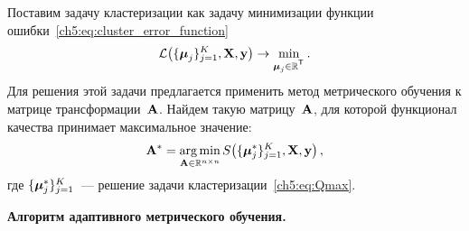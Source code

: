 \documentclass[11pt, a5paper]{dissert}
\begin{document}
Поставим задачу кластеризации как задачу минимизации функции ошибки~\eqref{ch5:eq:cluster_error_function}
\begin{equation}
	\label{ch5:eq:Qmax}
	\cL \bigl(\{\boldsymbol{\mu}_j\}_{j=1}^K, \bX, \by \bigr) \to \min_{\boldsymbol{\mu}_j \in \bbR^{\T}}.
\end{equation}
Для решения этой задачи предлагается применить метод метрического обучения к матрице трансформации~$\mathbf{A}$.
Найдем такую матрицу~$\mathbf{A}$, для которой функционал качества принимает максимальное значение:
\begin{equation}
	\label{ch5:eq:Amax}
	\mathbf{A}^* =\mathop{\arg \min}\limits_{\mathbf{A} \in \mathbb{R}^{n \times n}} S \bigl(\{\boldsymbol{\mu}_j^*\}_{j=1}^K, \mathbf{X}, \mathbf{y} \bigr)\,,
\end{equation}
где $\{\boldsymbol{\mu}_j^*\}_{j=1}^K$~--- решение задачи кластеризации~\eqref{ch5:eq:Qmax}.

\textbf{Алгоритм адаптивного метрического обучения.}
\label{sec:ch5:metric_learning_adaptive}
\end{document}

